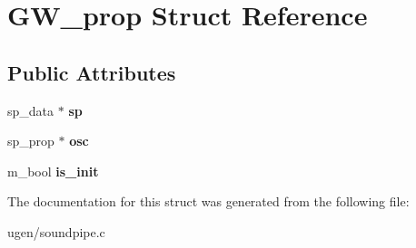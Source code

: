 \hypertarget{structGW__prop}{}\section{G\+W\+\_\+prop Struct Reference}
\label{structGW__prop}
\subsection*{Public Attributes}
\begin{DoxyCompactItemize}
\item 
\hypertarget{structGW__prop_adad0e4723def92c40c72ea37decf0f2f}{}\label{structGW__prop_adad0e4723def92c40c72ea37decf0f2f} 
sp\+\_\+data $\ast$ {\bfseries sp}
\item 
\hypertarget{structGW__prop_a37b9032a1accee29b95f5c398516be3e}{}\label{structGW__prop_a37b9032a1accee29b95f5c398516be3e} 
sp\+\_\+prop $\ast$ {\bfseries osc}
\item 
\hypertarget{structGW__prop_a028436eadb3d79054ad823b0ebd2bec5}{}\label{structGW__prop_a028436eadb3d79054ad823b0ebd2bec5} 
m\+\_\+bool {\bfseries is\+\_\+init}
\end{DoxyCompactItemize}


The documentation for this struct was generated from the following file\+:\begin{DoxyCompactItemize}
\item 
ugen/soundpipe.\+c\end{DoxyCompactItemize}
